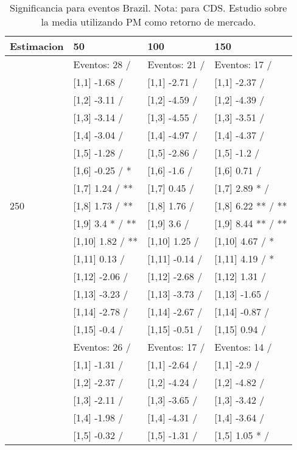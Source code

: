 \begin{table}

\caption{Significancia para eventos Brazil. Nota: para CDS. Estudio sobre la media utilizando PM como retorno de mercado.}
\centering
\begin{tabular}[t]{llll}
\toprule
Estimacion & 50 & 100 & 150\\
\midrule
 & Eventos:  28 / & Eventos:  21 / & Eventos:  17 /\\
 & {}[1,1] -1.68  / & {}[1,1] -2.71  / & {}[1,1] -2.37  /\\
 & {}[1,2] -3.11  / & {}[1,2] -4.59  / & {}[1,2] -4.39  /\\
 & {}[1,3] -3.14  / & {}[1,3] -4.55  / & {}[1,3] -3.51  /\\
 & {}[1,4] -3.04  / & {}[1,4] -4.97  / & {}[1,4] -4.37  /\\
\addlinespace
 & {}[1,5] -1.28  / & {}[1,5] -2.86  / & {}[1,5] -1.2  /\\
 & {}[1,6] -0.25  / * & {}[1,6] -1.6  / & {}[1,6] 0.71  /\\
 & {}[1,7] 1.24  / ** & {}[1,7] 0.45  / & {}[1,7] 2.89 * /\\
250 & {}[1,8] 1.73  / ** & {}[1,8] 1.76  / & {}[1,8] 6.22 ** / **\\
 & {}[1,9] 3.4 * / ** & {}[1,9] 3.6  / & {}[1,9] 8.44 ** / **\\
\addlinespace
 & {}[1,10] 1.82  / ** & {}[1,10] 1.25  / & {}[1,10] 4.67  / *\\
 & {}[1,11] 0.13  / & {}[1,11] -0.14  / & {}[1,11] 4.19  / *\\
 & {}[1,12] -2.06  / & {}[1,12] -2.68  / & {}[1,12] 1.31  /\\
 & {}[1,13] -3.23  / & {}[1,13] -3.73  / & {}[1,13] -1.65  /\\
 & {}[1,14] -2.78  / & {}[1,14] -2.67  / & {}[1,14] -0.87  /\\
\addlinespace
 & {}[1,15] -0.4  / & {}[1,15] -0.51  / & {}[1,15] 0.94  /\\
 & Eventos:  26 / & Eventos:  17 / & Eventos:  14 /\\
 & {}[1,1] -1.31  / & {}[1,1] -2.64  / & {}[1,1] -2.9  /\\
 & {}[1,2] -2.37  / & {}[1,2] -4.24  / & {}[1,2] -4.82  /\\
 & {}[1,3] -2.11  / & {}[1,3] -3.65  / & {}[1,3] -3.42  /\\
\addlinespace
 & {}[1,4] -1.98  / & {}[1,4] -4.31  / & {}[1,4] -3.64  /\\
 & {}[1,5] -0.32  / & {}[1,5] -1.31  / & {}[1,5] 1.05 * /\\

\end{tabular}
\end{table}
